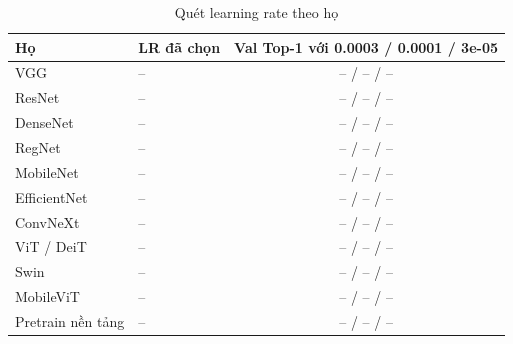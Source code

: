 \begin{table}[t]
\centering
\small
\caption{Quét learning rate theo họ}
\begin{tabular}{llc}
\toprule
Họ & LR đã chọn & Val Top-1 với 0.0003 / 0.0001 / 3e-05 \\
\midrule
VGG & – & – / – / – \\
ResNet & – & – / – / – \\
DenseNet & – & – / – / – \\
RegNet & – & – / – / – \\
MobileNet & – & – / – / – \\
EfficientNet & – & – / – / – \\
ConvNeXt & – & – / – / – \\
ViT / DeiT & – & – / – / – \\
Swin & – & – / – / – \\
MobileViT & – & – / – / – \\
Pretrain nền tảng & – & – / – / – \\
\bottomrule
\end{tabular}
\end{table}
